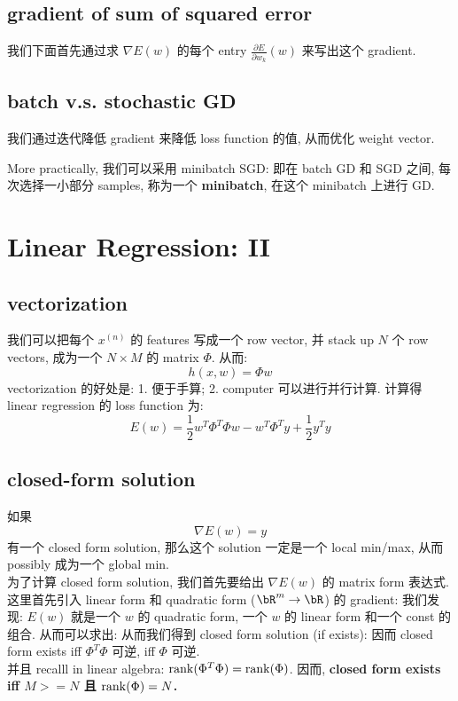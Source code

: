 \documentclass[lang=cn,11pt]{elegantbook}
\begin{document}
\section{gradient of sum of squared error}
我们下面首先通过求 $\nabla E(w)$ 的每个 entry $\frac{\partial E}{\partial w_k}(w)$ 来写出这个 gradient.




\section{batch v.s. stochastic GD}

我们通过迭代降低 gradient 来降低 loss function 的值, 从而优化 weight vector.

More practically, 我们可以采用 minibatch SGD: 即在 batch GD 和 SGD 之间, 每次选择一小部分 samples, 称为一个 \textbf{minibatch}, 在这个 minibatch 上进行 GD.







\chapter{Linear Regression: II}
\section{vectorization}
我们可以把每个 $x^{(n)}$ 的 features 写成一个 row vector, 并 stack up $N$ 个 row vectors, 成为一个 $N\times M$ 的 matrix $\Phi$. 从而:
$$
h(x,w) = \Phi w
$$
vectorization 的好处是: 1. 便于手算; 2. computer 可以进行并行计算.
计算得 linear regression 的 loss function 为:
\[
E(w) = \frac{1}{2}w^T \Phi^T \Phi w - w^T \Phi^T y + \frac{1}{2}y^T y
\]



\section{closed-form solution}
如果
$$
\nabla E(w) = y
$$
有一个 closed form solution, 那么这个 solution 一定是一个 local min/max, 从而 possibly 成为一个 global min.\\
为了计算 closed form solution, 我们首先要给出 $\nabla E(w)$ 的 matrix form 表达式. \\
这里首先引入 linear form 和 quadratic form ($\bR^m \rar \bR$) 的 gradient:
我们发现: $E(w)$ 就是一个 $w$ 的 quadratic form, 一个 $w$ 的 linear form 和一个 const 的组合. 从而可以求出:
从而我们得到 closed form solution (if exists):
因而 closed form exists iff $\Phi^T\Phi$ 可逆, iff $\Phi$ 可逆.\\
并且 recalll in linear algebra: $\operatorname{rank}(\Phi^T\Phi) = \operatorname{rank}(\Phi)$.
因而, \textbf{closed form exists iff $M >= N $ 且 $\operatorname{rank}(\Phi) = N$.}
\end{document}
